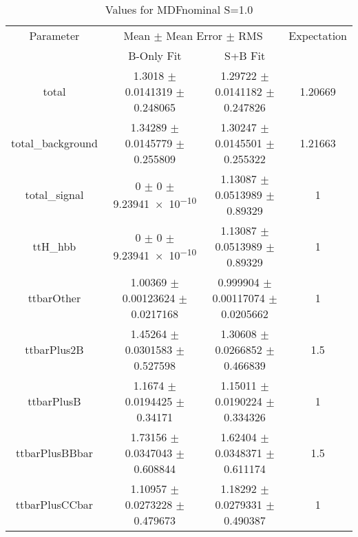 \begin{table}
\centering
\caption{Values for MDFnominal S=1.0}
\begin{tabular}{cccc}
\toprule
Parameter & \multicolumn{2}{c}{Mean $\pm$ Mean Error $\pm$ RMS} & Expectation\\
 & B-Only Fit & S+B Fit & \\
\midrule
total & \num{1.3018} $\pm$ \num{0.0141319} $\pm$ \num{0.248065} & \num{1.29722} $\pm$ \num{0.0141182} $\pm$ \num{0.247826} & \num{1.20669}\\
total\_background & \num{1.34289} $\pm$ \num{0.0145779} $\pm$ \num{0.255809} & \num{1.30247} $\pm$ \num{0.0145501} $\pm$ \num{0.255322} & \num{1.21663}\\
total\_signal & \num{0} $\pm$ \num{0} $\pm$ \num{9.23941e-10} & \num{1.13087} $\pm$ \num{0.0513989} $\pm$ \num{0.89329} & \num{1}\\
ttH\_hbb & \num{0} $\pm$ \num{0} $\pm$ \num{9.23941e-10} & \num{1.13087} $\pm$ \num{0.0513989} $\pm$ \num{0.89329} & \num{1}\\
ttbarOther & \num{1.00369} $\pm$ \num{0.00123624} $\pm$ \num{0.0217168} & \num{0.999904} $\pm$ \num{0.00117074} $\pm$ \num{0.0205662} & \num{1}\\
ttbarPlus2B & \num{1.45264} $\pm$ \num{0.0301583} $\pm$ \num{0.527598} & \num{1.30608} $\pm$ \num{0.0266852} $\pm$ \num{0.466839} & \num{1.5}\\
ttbarPlusB & \num{1.1674} $\pm$ \num{0.0194425} $\pm$ \num{0.34171} & \num{1.15011} $\pm$ \num{0.0190224} $\pm$ \num{0.334326} & \num{1}\\
ttbarPlusBBbar & \num{1.73156} $\pm$ \num{0.0347043} $\pm$ \num{0.608844} & \num{1.62404} $\pm$ \num{0.0348371} $\pm$ \num{0.611174} & \num{1.5}\\
ttbarPlusCCbar & \num{1.10957} $\pm$ \num{0.0273228} $\pm$ \num{0.479673} & \num{1.18292} $\pm$ \num{0.0279331} $\pm$ \num{0.490387} & \num{1}\\
\bottomrule
\end{tabular}
\end{table}